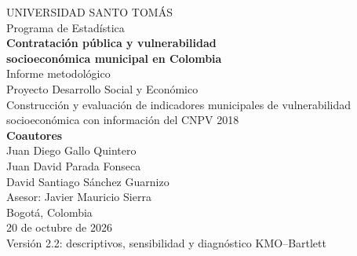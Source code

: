 \begin{titlepage}
\thispagestyle{empty}
\centering
\vspace*{1.5cm}
{\Large UNIVERSIDAD SANTO TOMÁS\\[0.25cm]}
{\large Programa de Estadística\\[1.4cm]}
{\Large\bfseries Contratación pública y vulnerabilidad\\socioeconómica municipal en Colombia\\[0.6cm]}
{\large Informe metodológico\\[0.5cm]}
{\Large Proyecto Desarrollo Social y Económico\\[1cm]}
{\large Construcción y evaluación de indicadores municipales de vulnerabilidad socioeconómica con información del CNPV 2018\\[1.2cm]}
\vfill
{\large\bfseries Coautores\\[0.4cm]}
{\large Juan Diego Gallo Quintero\\Juan David Parada Fonseca\\David Santiago Sánchez Guarnizo\\[0.7cm]}
{\large Asesor: Javier Mauricio Sierra\\[1cm]}
\vfill
{\large Bogotá, Colombia\\20 de octubre de 2026\\Versión 2.2: descriptivos, sensibilidad y diagnóstico KMO--Bartlett}
\end{titlepage}
\clearpage
